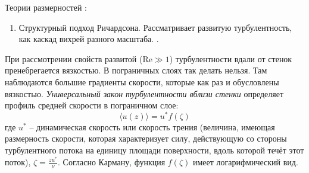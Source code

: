 Теории размерностей \cite{Носов-2013}:
\begin{enumerate}
\item Структурный подход Ричардсона. Рассматривает развитую турбулентность, как каскад вихрей разного масштаба. .
\end{enumerate}

При рассмотрении свойств развитой ($\text{Re}\gg 1$) турбулентности вдали от стенок пренебрегается вязкостью.
В пограничных слоях так делать нельзя.
Там наблюдаются большие градиенты скорости, которые как раз и обусловлены вязкостью.
\textit{Универсальный закон турбулентности вблизи стенки} определяет профиль средней скорости в пограничном слое:
\begin{equation}\label{eq-4-4-1}
\langle u(z)\rangle=u^{*}f(\zeta)
\end{equation}
где $u^*$ -- динамическая скорость или скорость трения (величина, имеющая размерность скорости, которая характеризует силу, действующую со стороны турбулентного потока на единицу площади поверхности, вдоль которой течёт этот поток), $\zeta=\frac{zu^*}{\nu}$.
Согласно Карману, функция $f(\zeta)$ имеет логарифмический вид.
